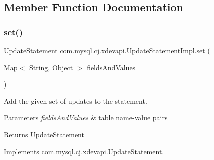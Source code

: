 \subsection{Member Function Documentation}
\mbox{\label{classcom_1_1mysql_1_1cj_1_1xdevapi_1_1_update_statement_impl_ad3e9fc6db7805042b6f73938782c2173}} 
\subsubsection{\texorpdfstring{set()}{set()}\hspace{0.1cm}{\footnotesize\ttfamily [1/2]}}
{\footnotesize\ttfamily \mbox{\hyperlink{interfacecom_1_1mysql_1_1cj_1_1xdevapi_1_1_update_statement}{Update\+Statement}} com.\+mysql.\+cj.\+xdevapi.\+Update\+Statement\+Impl.\+set (\begin{DoxyParamCaption}\item[{Map$<$ String, Object $>$}]{fields\+And\+Values }\end{DoxyParamCaption})}

Add the given set of updates to the statement.


\begin{DoxyParams}{Parameters}
{\em fields\+And\+Values} & table name-\/value pairs \\
\hline
\end{DoxyParams}
\begin{DoxyReturn}{Returns}
\mbox{\hyperlink{interfacecom_1_1mysql_1_1cj_1_1xdevapi_1_1_update_statement}{Update\+Statement}} 
\end{DoxyReturn}


Implements \mbox{\hyperlink{interfacecom_1_1mysql_1_1cj_1_1xdevapi_1_1_update_statement_a55ee82b73b4faf50fa2ba7dbbd723819}{com.\+mysql.\+cj.\+xdevapi.\+Update\+Statement}}.

\mbox{\label{classcom_1_1mysql_1_1cj_1_1xdevapi_1_1_update_statement_impl_a6100d1574e2958c9aa1229e70a476e37}} 
